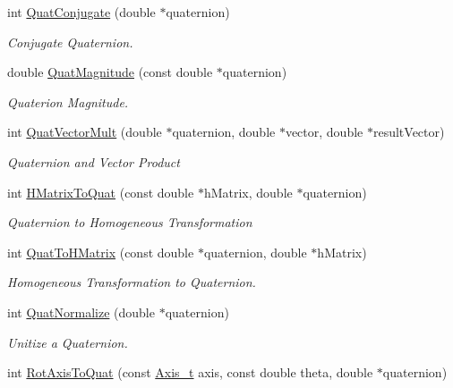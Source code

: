 \begin{CompactItemize}
int \hyperlink{group__quaternion_gc2441656cae8e9ea1d3b1030559bfd80}{QuatConjugate} (double $\ast$quaternion)
\begin{CompactList}\small\item\em Conjugate Quaternion. \item\end{CompactList}\item 
double \hyperlink{group__quaternion_g7c36b75808197e37e672aac00ee21935}{QuatMagnitude} (const double $\ast$quaternion)
\begin{CompactList}\small\item\em Quaterion Magnitude. \item\end{CompactList}\item 
int \hyperlink{group__quaternion_g67f342a45d5ce0d7a1c354d39e443f08}{QuatVectorMult} (double $\ast$quaternion, double $\ast$vector, double $\ast$resultVector)
\begin{CompactList}\small\item\em Quaternion and Vector Product \item\end{CompactList}\item 
int \hyperlink{group__quaternion_gb7f636ec0cec733d2511ca8b27c72ded}{HMatrixToQuat} (const double $\ast$hMatrix, double $\ast$quaternion)
\begin{CompactList}\small\item\em Quaternion to Homogeneous Transformation \item\end{CompactList}\item 
int \hyperlink{group__quaternion_gfa6b44f00762a156e643b894e1cd10d9}{QuatToHMatrix} (const double $\ast$quaternion, double $\ast$hMatrix)
\begin{CompactList}\small\item\em Homogeneous Transformation to Quaternion. \item\end{CompactList}\item 
int \hyperlink{group__quaternion_g2202f5791224a99890e77027cbfdc9a8}{QuatNormalize} (double $\ast$quaternion)
\begin{CompactList}\small\item\em Unitize a Quaternion. \item\end{CompactList}\item 
int \hyperlink{group__quaternion_gc0787b2da064df053ecf6ff927646b33}{RotAxisToQuat} (const \hyperlink{libdrdc_8h_32b2eaf8bafc891ec8018cbe48d39243}{Axis\_\-t} axis, const double theta, double $\ast$quaternion)

\end{CompactItemize}
